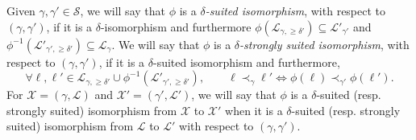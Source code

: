 \documentclass[11pt]{article}
\begin{document}
Given $\gamma,\gamma'\in \mathscr{S}$, we will say that $\phi$ is a {\it $\delta$-suited isomorphism}, with respect to $(\gamma,\gamma')$, if it is a $\delta$-isomorphism and furthermore $\phi (\mathcal{L}_{\gamma, \geq \delta'})\subseteq \mathcal{L}'_{\gamma'}$ and $\phi^{-1} (\mathcal{L}'_{\gamma', \geq \delta'})\subseteq \mathcal{L}_{\gamma}$.
We will say that
$\phi$ is a {\it $\delta$-strongly suited isomorphism}, with respect to $(\gamma,\gamma')$, if it is a $\delta$-suited isomorphism
and furthermore,
\[
\forall \ell,\ell'\in \mathcal{L}_{\gamma, \geq \delta'} \cup \phi^{-1}(\mathcal{L}'_{\gamma', \geq \delta'}  ), \qquad \ell \prec_\gamma \ell' \iff \phi(\ell)\prec_{\gamma'} \phi(\ell').
\]
For $\mathcal{X}=(\gamma,\mathcal{L})$ and $\mathcal{X}'=(\gamma',\mathcal{L}')$, we will say that $\phi$ is a $\delta$-suited (resp. strongly suited) isomorphism from $\mathcal{X}$ to $\mathcal{X}'$ when it is a $\delta$-suited (resp. strongly suited) isomorphism from $\mathcal{L}$ to $\mathcal{L}'$ with respect to $(\gamma,\gamma')$.
\end{document}
